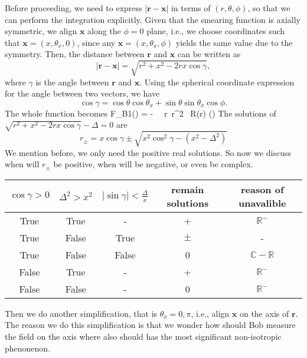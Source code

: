 \documentclass[a4paper,12pt]{article}
\begin{document}
Before proceeding, we need to express $|\mathbf{r} - \mathbf{x}|$ in terms of $(r, \theta, \phi)$, so that we can perform the integration explicitly. Given that the smearing function is axially symmetric, we align $\mathbf{x}$ along the $\phi = 0$ plane, i.e., we choose coordinates such that $\mathbf{x} = (x, \theta_x, 0)$, since any $\mathbf{x} = (x, \theta_x, \phi)$ yields the same value due to the symmetry. Then, the distance between $\mathbf{r}$ and $\mathbf{x}$ can be written as
\[
|\mathbf{r} - \mathbf{x}| = \sqrt{r^2 + x^2 - 2rx \cos\gamma},
\]
where $\gamma$ is the angle between $\mathbf{r}$ and $\mathbf{x}$. Using the spherical coordinate expression for the angle between two vectors, we have
\[
\cos\gamma = \cos\theta \cos\theta_x + \sin\theta \sin\theta_x \cos\phi.
\]
The whole function becomes
\be
    F_{B1}() = - \int {}\theta\, \phi\, r\, r^2 \, R(r) \delta(\theta) 
\ee
The solutions of $\sqrt{r^2 + x^2 - 2rx \cos\gamma} - \Delta = 0$ are
\[
    r_\pm = x\cos\gamma \pm \sqrt{x^2 \cos^2\gamma - (x^2 - \Delta^2)}
\]
We mention before, we only need the positive real solutions. So now we discuss when will $r_\pm$ be positive, when will be negative, or even be complex.
\begin{center}
  \begin{tabular}{|c|c|c|c|c|}
    \hline
    $\cos{\gamma} > 0$ & $\Delta^2 > x^2$ & $\left|\sin\gamma\right| < \frac{\Delta}{x}$ & remain solutions & reason of unavalible\\
    \hline\hline
    True & True & - & + & $\mathbb{R^-}$\\
    True & False & True & $\pm$ & -\\
    True & False & False & 0 & $\mathbb{C-R}$\\
    False & True & - & + & $\mathbb{R^-}$\\
    False & False & - & 0 & $\mathbb{R^-}$\\
    \hline
  \end{tabular}
\end{center}
Then we do another simplification, that is $\theta_x = 0, \pi$, i.e., align $\mathbf{x}$ on the axis of $\mathbf{r}$. The reason we do this simplification is that we wonder how should Bob measure the field on the axis where also should has the most significant non-isotropic phenonenon.
\end{document}
